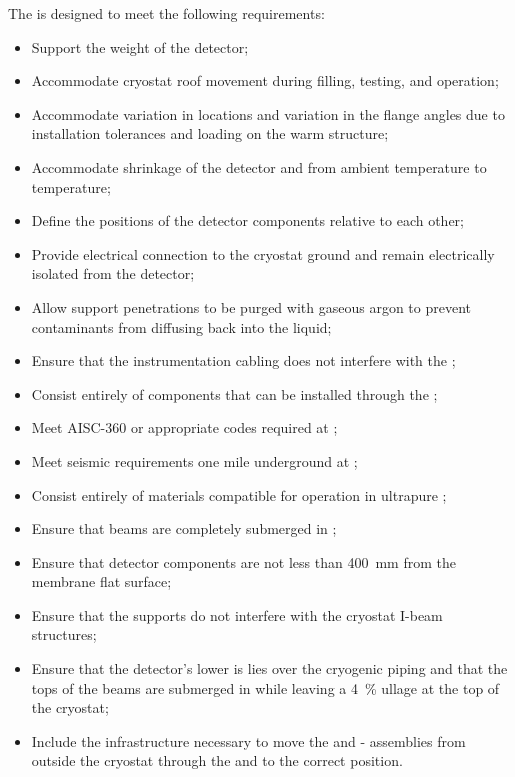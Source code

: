 The  is designed to meet the following  requirements:
\begin{itemize}
 \setlength\itemsep{1mm}
\setlength{\parsep}{1mm}
\setlength{\itemsep}{-5mm}
\item Support the weight of the detector;
\item Accommodate cryostat roof movement during filling, testing, and operation;
\item Accommodate variation in \fdth locations and
  variation in the flange angles due to installation tolerances and
  loading on the warm structure;
\item Accommodate shrinkage of the detector and  from ambient
  temperature to  temperature;
\item Define the positions of the detector components relative to each other; 
\item Provide electrical connection to the cryostat ground and remain electrically isolated from the detector;
\item Allow support penetrations to be purged with gaseous argon to prevent contaminants from diffusing back into the liquid; 
\item Ensure that the instrumentation cabling does not interfere with the ;
\item Consist entirely of components that can  
be installed through the ;
\item %
Meet AISC-360 or appropriate codes required at ;
\item %
Meet seismic requirements one mile underground at ;
\item Consist entirely of %
materials compatible for operation in ultrapure ;
\item Ensure that beams are completely submerged in ;
\item Ensure that detector components are not less than \SI{400}{mm} from the membrane flat surface;
\item Ensure that the supports do not interfere with the cryostat I-beam structures;
\item Ensure %
that the detector's lower  is lies over the cryogenic piping and that the tops of the  beams are submerged in  while leaving a \SI{4}{\%} ullage at the top of the cryostat;
\item Include the infrastructure necessary to move the  and
  - assemblies from outside the cryostat through the
   and to the correct position.
\end{itemize}

